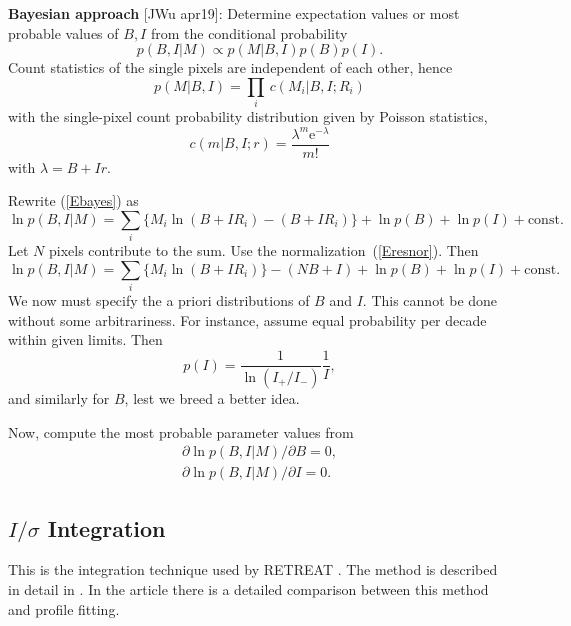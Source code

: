 \documentclass[11pt,a4paper]{article}
\begin{document}
\textbf{Bayesian approach} [JWu apr19]:
Determine expectation values or most probable values of $B,I$ from the conditional probability
\begin{equation}\label{Ebayes}
  p(B,I|M) \propto p(M|B,I) p(B) p(I).
\end{equation}
Count statistics of the single pixels are independent of each other, hence
\begin{equation}\label{Ec2p}
  p(M|B,I) = \prod_i\, c(M_i|B,I;R_i)
\end{equation}
with the single-pixel count probability distribution given by Poisson statistics,
\begin{equation}
  c(m|B,I;r) = \frac{\lambda^m{\mathrm e}^{-\lambda}}{m!}
\end{equation}
with $\lambda=B+Ir$.

Rewrite (\ref{Ebayes}) as
\begin{equation}
  \ln p(B,I|M) = \sum_i\Big\{M_i\ln(B+IR_i)-(B+IR_i)\Big\} +\ln p(B) + \ln p(I) + \mathrm{const}.
\end{equation}
Let $N$ pixels contribute to the sum.
Use the normalization~(\ref{Eresnor}).
Then
\begin{equation}
  \ln p(B,I|M) = \sum_i\Big\{M_i\ln(B+IR_i)\Big\}-(NB+I) +\ln p(B) + \ln p(I) + \mathrm{const}.
\end{equation}
We now must specify the a priori distributions of $B$ and $I$.
This cannot be done without some arbitrariness.
For instance, assume equal probability per decade within given limits.
Then
\begin{equation}
  p(I) = \frac{1}{\ln(I_{+}/I_{-})} \frac{1}{I},
\end{equation}
and similarly for $B$, lest we breed a better idea.

Now, compute the most probable parameter values from
\begin{equation}
  \begin{array}{l}
  \partial \ln p(B,I|M) / \partial B = 0, \\[1.2ex]
  \partial \ln p(B,I|M) / \partial I = 0.
  \end{array}
\end{equation}


\subsection{$I/\sigma$ Integration}

This is the integration technique used by RETREAT \cite{StMc13}. The method is described in detail in \cite{WiKS88}.
In the article \cite{PrWM97} there is a detailed comparison between this method and profile fitting.
\end{document}
